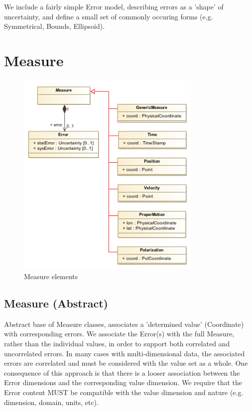 We include a fairly simple Error model, describing errors as a 'shape' of uncertainty, and define a small set of commonly occuring forms (e.g. Symmetrical, Bounds, Ellipsoid).

\pagebreak
\section{Measure}

  \begin{figure}[h]
  \begin{center}
    \includegraphics[width=3.5in]{diagrams/Measure.png}
    \caption{Measure elements}\label{fig:measure}
  \end{center}
  \end{figure}

  \subsection{Measure (Abstract)}
  \label{sect:Measure}
    Abstract base of Measure classes, associates a 'determined value' (Coordinate) with corresponding errors. We associate the Error(s) with the full Measure, rather than the individual values, in order to support both correlated and uncorrelated errors. In many cases with multi-dimensional data, the associated errors are correlated and must be considered with the value set as a whole. One consequence of this approach is that there is a looser association between the Error dimensions and the corresponding value dimension. We require that the Error content MUST be compatible with the value dimension and nature (e.g. dimension, domain, units, etc).

